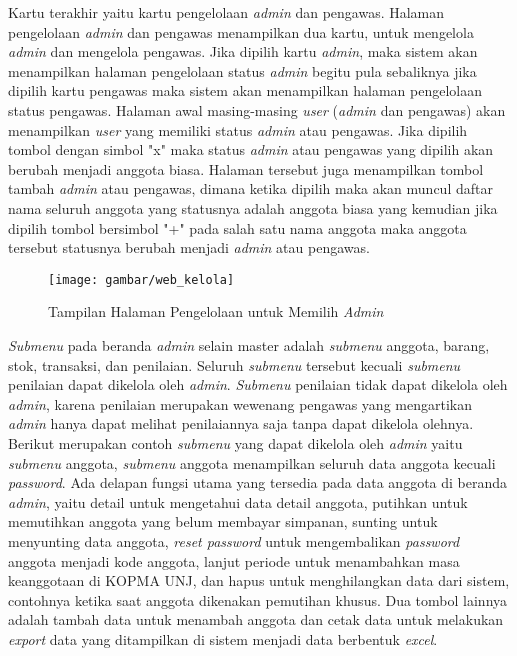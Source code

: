 Kartu terakhir yaitu kartu pengelolaan \textit{admin} dan pengawas. Halaman pengelolaan \textit{admin} dan pengawas menampilkan dua kartu, untuk mengelola \textit{admin} dan mengelola pengawas. Jika dipilih kartu \textit{admin}, maka sistem akan menampilkan halaman pengelolaan status \textit{admin} begitu pula sebaliknya jika dipilih kartu pengawas maka sistem akan menampilkan halaman pengelolaan status pengawas. Halaman awal masing-masing \textit{user} (\textit{admin} dan pengawas) akan menampilkan \textit{user} yang memiliki status \textit{admin} atau pengawas. Jika dipilih tombol dengan simbol "x" maka status \textit{admin} atau pengawas yang dipilih akan berubah menjadi anggota biasa. Halaman tersebut juga menampilkan tombol tambah \textit{admin} atau pengawas, dimana ketika dipilih maka akan muncul daftar nama seluruh anggota yang statusnya adalah anggota biasa yang kemudian jika dipilih tombol bersimbol "+" pada salah satu nama anggota maka anggota tersebut statusnya berubah menjadi \textit{admin} atau pengawas.

\begin{figure}[H]
	\centering
	\texttt{[image: gambar/web\_kelola]}
	\caption{Tampilan Halaman Pengelolaan untuk Memilih \textit{Admin}}
\end{figure} 

\textit{Submenu} pada beranda \textit{admin} selain master adalah \textit{submenu} anggota, barang, stok, transaksi, dan penilaian. Seluruh \textit{submenu} tersebut kecuali \textit{submenu} penilaian dapat dikelola oleh \textit{admin}. \textit{Submenu} penilaian tidak dapat dikelola oleh \textit{admin}, karena penilaian merupakan wewenang pengawas yang mengartikan \textit{admin} hanya dapat melihat penilaiannya saja tanpa dapat dikelola olehnya. Berikut merupakan contoh \textit{submenu} yang dapat dikelola oleh \textit{admin} yaitu \textit{submenu} anggota, \textit{submenu} anggota menampilkan seluruh data anggota kecuali \textit{password}. Ada delapan fungsi utama yang tersedia pada data anggota di beranda \textit{admin}, yaitu detail untuk mengetahui data detail anggota, putihkan untuk memutihkan anggota yang belum membayar simpanan, sunting untuk menyunting data anggota, \textit{reset password} untuk mengembalikan \textit{password} anggota menjadi kode anggota, lanjut periode untuk menambahkan masa keanggotaan di KOPMA UNJ, dan hapus untuk menghilangkan data dari sistem, contohnya ketika saat anggota dikenakan pemutihan khusus. Dua tombol lainnya adalah tambah data untuk menambah anggota dan cetak data untuk melakukan \textit{export} data yang ditampilkan di sistem menjadi data berbentuk \textit{excel}.

